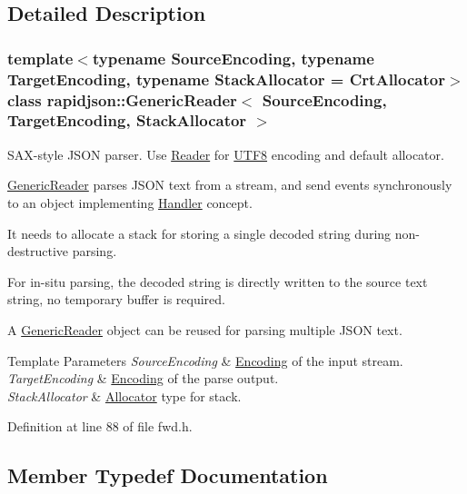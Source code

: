\subsection{Detailed Description}
\subsubsection*{template$<$typename Source\+Encoding, typename Target\+Encoding, typename Stack\+Allocator = Crt\+Allocator$>$\newline
class rapidjson\+::\+Generic\+Reader$<$ Source\+Encoding, Target\+Encoding, Stack\+Allocator $>$}

S\+A\+X-\/style J\+S\+ON parser. Use \mbox{\hyperlink{namespacerapidjson_ad5310edd1226f5b3ea82dc0d4d3740c6}{Reader}} for \mbox{\hyperlink{structrapidjson_1_1_u_t_f8}{U\+T\+F8}} encoding and default allocator. 

\mbox{\hyperlink{classrapidjson_1_1_generic_reader}{Generic\+Reader}} parses J\+S\+ON text from a stream, and send events synchronously to an object implementing \mbox{\hyperlink{classrapidjson_1_1_handler}{Handler}} concept.

It needs to allocate a stack for storing a single decoded string during non-\/destructive parsing.

For in-\/situ parsing, the decoded string is directly written to the source text string, no temporary buffer is required.

A \mbox{\hyperlink{classrapidjson_1_1_generic_reader}{Generic\+Reader}} object can be reused for parsing multiple J\+S\+ON text.


\begin{DoxyTemplParams}{Template Parameters}
{\em Source\+Encoding} & \mbox{\hyperlink{classrapidjson_1_1_encoding}{Encoding}} of the input stream. \\
\hline
{\em Target\+Encoding} & \mbox{\hyperlink{classrapidjson_1_1_encoding}{Encoding}} of the parse output. \\
\hline
{\em Stack\+Allocator} & \mbox{\hyperlink{classrapidjson_1_1_allocator}{Allocator}} type for stack. \\
\hline
\end{DoxyTemplParams}


Definition at line 88 of file fwd.\+h.



\subsection{Member Typedef Documentation}
\mbox{\label{classrapidjson_1_1_generic_reader_a0781d19e8c6bc044d9cc5f5d3dde287e}} 
